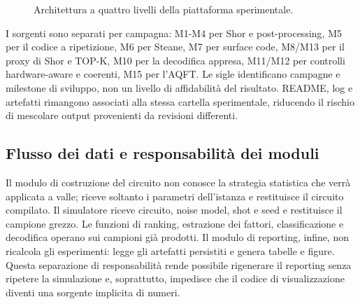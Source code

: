 \begin{figure}[H]
\centering
{}

\caption{Architettura a quattro livelli della piattaforma sperimentale.}\label{fig:finale_4_1}
\end{figure}

I sorgenti sono separati per campagna: M1-M4 per Shor e post-processing, M5 per il codice a ripetizione, M6 per Steane, M7 per surface code, M8/M13 per il proxy di Shor e TOP-K, M10 per la decodifica appresa, M11/M12 per controlli hardware-aware e coerenti, M15 per l'AQFT. Le sigle identificano campagne e milestone di sviluppo, non un livello di affidabilità del risultato. README, log e artefatti rimangono associati alla stessa cartella sperimentale, riducendo il rischio di mescolare output provenienti da revisioni differenti.

\subsection{Flusso dei dati e responsabilità dei moduli}\label{sec:finale_4_2_1}

Il modulo di costruzione del circuito non conosce la strategia statistica che verrà applicata a valle; riceve soltanto i parametri dell'istanza e restituisce il circuito compilato. Il simulatore riceve circuito, noise model, shot e seed e restituisce il campione grezzo. Le funzioni di ranking, estrazione dei fattori, classificazione e decodifica operano sui campioni già prodotti. Il modulo di reporting, infine, non ricalcola gli esperimenti: legge gli artefatti persistiti e genera tabelle e figure. Questa separazione di responsabilità rende possibile rigenerare il reporting senza ripetere la simulazione e, soprattutto, impedisce che il codice di visualizzazione diventi una sorgente implicita di numeri.

